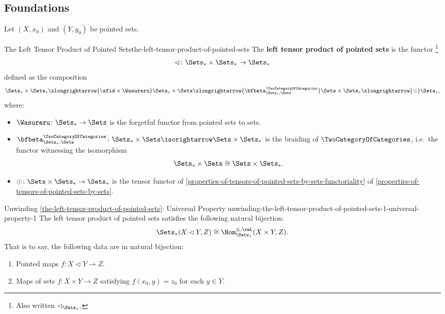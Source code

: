 \subsection{Foundations}\label{subsection-the-left-tensor-product-of-pointed-sets-foundations}
Let $(X,x_{0})$ and $(Y,y_{0})$ be pointed sets.
\begin{definition}{The Left Tensor Product of Pointed Sets}{the-left-tensor-product-of-pointed-sets}%
    The \textbf{left tensor product of pointed sets} is the functor%
    \footnote{%
        Also written $\lhd_{\Sets_{*}}$.
        \par\vspace*{\TCBBoxCorrection}
    }%
    \[
        \lhd%
        \colon%
        \Sets_{*}\times\Sets_{*}%
        \to%
        \Sets_{*}%
    \]%
    defined as the composition
    \[
        \Sets_{*}\times\Sets_{*}%
        \xlongrightarrow{\sfid\times\Wasureru}%
        \Sets_{*}\times\Sets%
        \xlongrightarrow{\bfbeta^{\TwoCategoryOfCategories}_{\Sets_{*},\Sets}}%
        \Sets\times\Sets_{*}%
        \xlongrightarrow{\odot}%
        \Sets_{*},%
    \]%
    where:
    \begin{itemize}
        \item $\Wasureru\colon\Sets_{*}\to\Sets$ is the forgetful functor from pointed sets to sets.
        \item ${\bfbeta^{\TwoCategoryOfCategories}_{\Sets_{*},\Sets}}\colon\Sets_{*}\times\Sets\isorightarrow\Sets\times\Sets_{*}$ is the braiding of $\TwoCategoryOfCategories$, i.e.\ the functor witnessing the isomorphism%
            \[
                \Sets_{*}\times\Sets%
                \cong%
                \Sets\times\Sets_{*}.%
            \]%
        \item $\odot\colon\Sets\times\Sets_{*}\to\Sets_{*}$ is the tensor functor of \cref{properties-of-tensors-of-pointed-sets-by-sets-functoriality} of \cref{properties-of-tensors-of-pointed-sets-by-sets}.%
    \end{itemize}
\end{definition}
\begin{remark}{Unwinding \cref{the-left-tensor-product-of-pointed-sets}: Universal Property \rmI}{unwinding-the-left-tensor-product-of-pointed-sets-1-universal-property-1}%
    The left tensor product of pointed sets satisfies the following natural bijection:%
    \[%
        \Sets_{*}(X\lhd Y,Z)%
        \cong%
        \Hom^{\otimes,\rmL}_{\Sets_{*}}(X\times Y,Z).
    \]%
    That is to say, the following data are in natural bijection:
    \begin{enumerate}
        \item Pointed maps $f\colon X\lhd Y\to Z$.
        \item Maps of sets $f\colon X\times Y\to Z$ satisfying $f(x_{0},y)=z_{0}$ for each $y\in Y$.
    \end{enumerate}
\end{remark}
